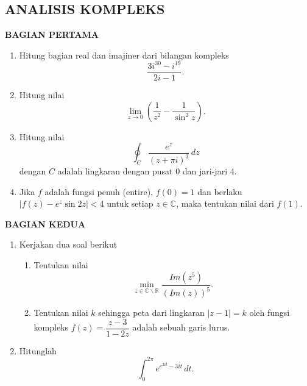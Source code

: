 \documentclass[12pt,twoside]{article}
\begin{document}
\subsection{ANALISIS KOMPLEKS}
\textbf{BAGIAN PERTAMA}
\begin{enumerate}
	\item Hitung bagian real dan imajiner dari bilangan kompleks
	      \begin{equation*}
		      \dfrac{3i^{30}-i^{19}}{2i-1}.
	      \end{equation*}

	\item Hitung nilai
	      \begin{equation*}
		      \displaystyle\lim_{z \to 0} \left( \dfrac{1}{z^2} - \dfrac{1}{\sin^2 z} \right).
	      \end{equation*}

	\item Hitung nilai
	      \begin{equation*}
		      \displaystyle\oint_C \dfrac{e^z}{(z+\pi i)^3} \, dz
	      \end{equation*}
	      dengan $C$ adalah lingkaran dengan pusat $0$ dan jari-jari 4.

	\item Jika $f$ adalah fungsi penuh (entire), $f(0)=1$ dan berlaku $|f(z)-e^z\sin2z| < 4$ untuk setiap $z\in \mathbb{C}$, maka tentukan nilai dari $f(1)$.
\end{enumerate}
\newpage \textbf{BAGIAN KEDUA}
\begin{enumerate}
	\item Kerjakan dua soal berikut
	      \begin{enumerate}
		      \item Tentukan nilai
		            \begin{equation*}
			            \displaystyle \min_{z \in \mathbb{C} \backslash \mathbb{R}} \dfrac{Im (z^5)}{(Im (z))^5}.
		            \end{equation*}
		      \item Tentukan nilai $k$ sehingga peta dari lingkaran $|z-1|=k$ oleh fungsi kompleks $f(z) = \dfrac{z-3}{1-2z}$ adalah sebuah garis lurus.
	      \end{enumerate}

	\item Hitunglah
	      \begin{equation*}
		      \displaystyle\int_{0}^{2\pi} e^{e^{2it}-3it} \, dt.
	      \end{equation*}
\end{enumerate}
\pagebreak
\end{document}
